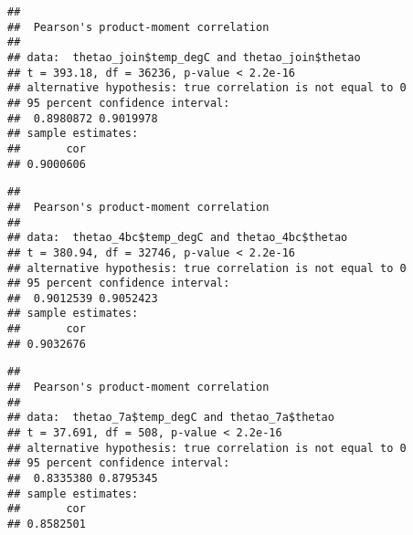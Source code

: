 \documentclass[
]{article}
\newenvironment{Shaded}{\begin{snugshade}}{\end{snugshade}}
\newcommand{\CommentTok}[1]{\textcolor[rgb]{0.56,0.35,0.01}{\textit{#1}}}
\newcommand{\FunctionTok}[1]{\textcolor[rgb]{0.00,0.00,0.00}{#1}}
\newcommand{\NormalTok}[1]{#1}
\newcommand{\OtherTok}[1]{\textcolor[rgb]{0.56,0.35,0.01}{#1}}
\newcommand{\SpecialCharTok}[1]{\textcolor[rgb]{0.00,0.00,0.00}{#1}}
\newcommand{\StringTok}[1]{\textcolor[rgb]{0.31,0.60,0.02}{#1}}
\begin{document}
\begin{verbatim}
## 
##  Pearson's product-moment correlation
## 
## data:  thetao_join$temp_degC and thetao_join$thetao
## t = 393.18, df = 36236, p-value < 2.2e-16
## alternative hypothesis: true correlation is not equal to 0
## 95 percent confidence interval:
##  0.8980872 0.9019978
## sample estimates:
##       cor 
## 0.9000606
\end{verbatim}

\begin{Shaded}
\end{Shaded}

\begin{verbatim}
## 
##  Pearson's product-moment correlation
## 
## data:  thetao_4bc$temp_degC and thetao_4bc$thetao
## t = 380.94, df = 32746, p-value < 2.2e-16
## alternative hypothesis: true correlation is not equal to 0
## 95 percent confidence interval:
##  0.9012539 0.9052423
## sample estimates:
##       cor 
## 0.9032676
\end{verbatim}

\begin{Shaded}
\end{Shaded}

\begin{verbatim}
## 
##  Pearson's product-moment correlation
## 
## data:  thetao_7a$temp_degC and thetao_7a$thetao
## t = 37.691, df = 508, p-value < 2.2e-16
## alternative hypothesis: true correlation is not equal to 0
## 95 percent confidence interval:
##  0.8335380 0.8795345
## sample estimates:
##       cor 
## 0.8582501
\end{verbatim}
\end{document}

